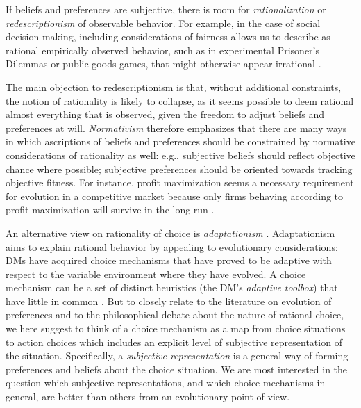 \documentclass[fleqn,reqno,12pt]{article}
\theoremstyle{Satz}
\theoremstyle{Bsp}
\begin{document}
If beliefs and preferences are subjective, there is room for \emph{rationalization} or
\emph{redescriptionism} of observable behavior. For example,
in the case of social decision making, including considerations of fairness allows us to
describe as rational empirically observed behavior, such as in experimental Prisoner's Dilemmas
or public goods games, that might otherwise appear irrational
\citep[e.g.,][]{fehrschmidt99,charrab02}.

The main objection to redescriptionism is that, without additional constraints, the notion of
rationality is likely to collapse, as it seems possible to deem rational almost everything that
is observed, given the freedom to adjust beliefs and preferences at will. \emph{Normativism}
therefore emphasizes that there are many ways in which ascriptions of beliefs and preferences
should be constrained by normative considerations of rationality as well: e.g., subjective
beliefs should reflect objective chance where possible; subjective preferences should be
oriented towards tracking objective fitness. For instance, profit maximization seems a
necessary requirement for evolution in a competitive market because only firms behaving
according to profit maximization will survive in the long run \citep[e.g.,][]{alch50,Fried53}.

An alternative view on rationality of choice is \emph{adaptationism}
\citep[e.g.,][]{Anderson1991:Is-human-cognit,ChaterOaksford2000:The-Rational-An,HagenChater2012:Decision-Making}. Adaptationism
aims to explain rational behavior by appealing to evolutionary considerations: DMs have
acquired choice mechanisms that have proved to be adaptive with respect to the variable
environment where they have evolved. A choice mechanism can be a set of distinct heuristics
(the DM's \emph{adaptive toolbox}) that have little in common
\citep[e.g.,][]{TverskyKahnemann1981:The-Framing-of-,GigerenzerGoldstein1996:Reasoning-the-F,ScheibehenneRieskamp2013:Testing-the-Ada}. But
to closely relate to the literature on evolution of preferences and to the philosophical debate
about the nature of rational choice, we here suggest to think of a choice mechanism as a map
from choice situations to action choices which includes an explicit level of subjective
representation of the situation. Specifically, a \emph{subjective representation} is a general
way of forming preferences and beliefs about the choice situation. We are most interested in
the question which subjective representations, and which choice mechanisms in general, are
better than others from an evolutionary point of view.
\end{document}
